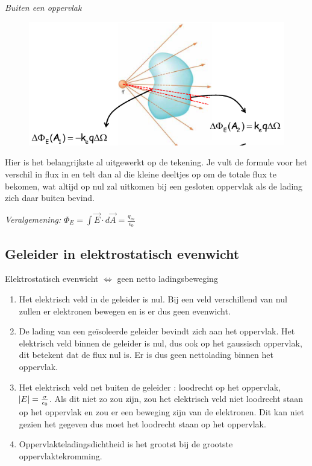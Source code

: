 \documentclass[12pt,a4paper]{article}
\begin{document}
   \textit{Buiten een oppervlak}
   \begin{figure}[h]
   	\centering
   	\includegraphics[width=0.7\linewidth]{null.png}
   	\label{fig:nul}
   \end{figure}
	Hier is het belangrijkste al uitgewerkt op de tekening. Je vult de formule voor het verschil in flux in en telt dan al die kleine deeltjes op om de totale flux te bekomen, wat altijd op nul zal uitkomen bij een gesloten oppervlak als de lading zich daar buiten bevind.
   \newline
   
   \textit{Veralgemening:} \(\Phi_E = \int\vec{E}\cdot d\vec{A} = \frac{q_{in}}{\epsilon_0}\)
   	
   	\subsection{Geleider in elektrostatisch evenwicht}
   	Elektrostatisch evenwicht $\iff$ geen netto ladingsbeweging
   	\begin{enumerate}
   		\item Het elektrisch veld in de geleider is nul.
   		Bij een veld verschillend van nul zullen er elektronen bewegen en is er dus geen evenwicht. 
   		\item De lading van een geïsoleerde geleider bevindt zich aan het oppervlak.
   		Het elektrisch veld binnen de geleider is nul, dus ook op het gaussisch oppervlak, dit betekent dat de flux nul is. Er is dus geen nettolading binnen het oppervlak.
   		\item Het elektrisch veld net buiten de geleider : loodrecht op het oppervlak, $\abs{E} = \frac{\sigma}{\epsilon_0}$. 
   		Als dit niet zo zou zijn, zou het elektrisch veld niet loodrecht staan op het oppervlak en zou er een beweging zijn van de elektronen. Dit kan niet gezien het gegeven dus moet het loodrecht staan op het oppervlak.
   		\item Oppervlakteladingsdichtheid is het grootst bij de grootste oppervlaktekromming. 
   	\end{enumerate}
    
\end{document}
